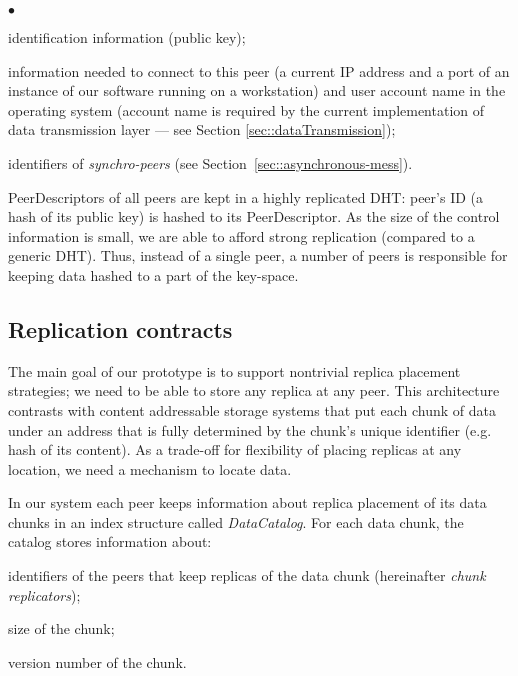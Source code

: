 \documentclass[10pt, final, conference, letterpaper]{IEEEtran}
\begin{document}
\begin{list}{$\bullet$}{\setlength{\leftmargin}{8pt} \setlength{\labelwidth}{0pt}}
        \setlength{\itemsep}{2pt}

\item identification information (public key); 

\item information needed to connect to this peer (a current IP address and a port of an instance of our software running on a workstation) and user account name in the operating system (account name is required by the current implementation of data transmission layer --- see Section \ref{sec::dataTransmission});

\item identifiers of \emph{synchro-peers} (see Section~\ref{sec::asynchronous-mess}). 
\end{list}

PeerDescriptors of all peers are kept in a highly replicated DHT: peer's ID (a hash of its public key) is hashed to its PeerDescriptor. 
As the size of the control information is small, we are able to afford strong replication (compared to a generic DHT). 
Thus, instead of a single peer, a number of peers is responsible for keeping data hashed to a part of the key-space.

\subsection{Replication contracts}\label{sec::catalog}
The main goal of our prototype is to support nontrivial replica placement strategies; we need to be able to store any replica at any peer. 
This architecture contrasts with content addressable storage systems that put each chunk of data under an address that is fully determined by the chunk's unique identifier (e.g. hash of its content).
As a trade-off for flexibility of placing replicas at any location, we need a mechanism to locate data.

In our system each peer keeps information about replica placement of its data chunks in an index structure called \textit{DataCatalog}.  
For each data chunk, the catalog stores information about:
\begin{inparaenum}[(i)]
\item identifiers of the peers that keep replicas of the data chunk (hereinafter \textit{chunk replicators});
\item size of the chunk;
\item version number of the chunk.
\end{inparaenum}
\end{document}

